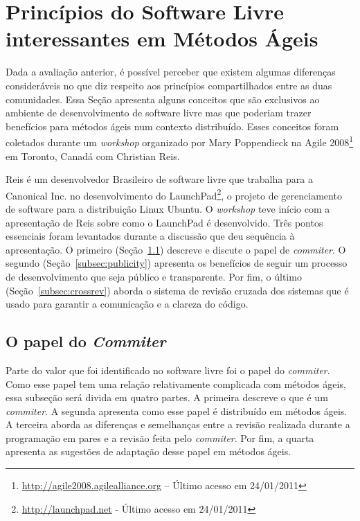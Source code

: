 \section{Princípios do Software Livre interessantes em Métodos Ágeis}
\label{sec:foss-over-agile}

Dada a avaliação anterior, é possível perceber que existem algumas
diferenças consideráveis no que diz respeito aos princípios
compartilhados entre as duas comunidades. Essa Seção apresenta alguns
conceitos que são exclusivos ao ambiente de desenvolvimento de
software livre mas que poderiam trazer benefícios para métodos ágeis
num contexto distribuído. Esses conceitos foram coletados durante um
\emph{workshop} organizado por Mary Poppendieck na Agile
2008\footnote{\url{http://agile2008.agilealliance.org} -- Último
  acesso em 24/01/2011} em Toronto, Canadá com Christian Reis.

Reis é um desenvolvedor Brasileiro de software livre que trabalha para
a Canonical Inc. no desenvolvimento do
LaunchPad\footnote{\url{http://launchpad.net} - Último acesso em
  24/01/2011}, o projeto de gerenciamento de software para a
distribuição Linux Ubuntu. O \emph{workshop} teve início com a
apresentação de Reis sobre como o LaunchPad é desenvolvido. Três
pontos essenciais foram levantados durante a discussão que deu
sequência à apresentação. O primeiro (Seção~\ref{subsec:commiter})
descreve e discute o papel de \emph{commiter}.  O segundo
(Seção~\ref{subsec:publicity}) apresenta os benefícios de seguir um
processo de desenvolvimento que seja público e transparente.  Por fim,
o último (Seção~\ref{subsec:crossrev}) aborda o sistema de revisão
cruzada dos sistemas que é usado para garantir a comunicação e a
clareza do código.

\subsection{O papel do \emph{Commiter}}
\label{subsec:commiter}

Parte do valor que foi identificado no software livre foi o papel do
\emph{commiter}. Como esse papel tem uma relação relativamente
complicada com métodos ágeis, essa subseção será divida em quatro
partes. A primeira descreve o que é um \emph{commiter}. A segunda
apresenta como esse papel é distribuído em métodos ágeis. A terceira
aborda as diferenças e semelhanças entre a revisão realizada durante a
programação em pares e a revisão feita pelo \emph{commiter}. Por fim,
a quarta apresenta as sugestões de adaptação desse papel em métodos
ágeis.

